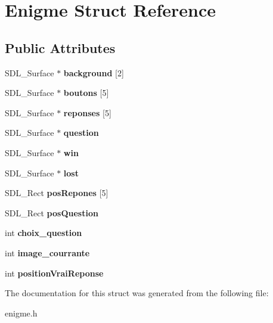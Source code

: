 \hypertarget{structEnigme}{}\section{Enigme Struct Reference}
\label{structEnigme}
\subsection*{Public Attributes}
\begin{DoxyCompactItemize}
\item 
\mbox{\label{structEnigme_a4cd8d8e0cb1572ed1f34f17b7c9d5936}} 
S\+D\+L\+\_\+\+Surface $\ast$ {\bfseries background} \mbox{[}2\mbox{]}
\item 
\mbox{\label{structEnigme_a9461c400dca33109161b4e274665623f}} 
S\+D\+L\+\_\+\+Surface $\ast$ {\bfseries boutons} \mbox{[}5\mbox{]}
\item 
\mbox{\label{structEnigme_ac9591e5cf1c5ed6bd3aafde9dcac1abe}} 
S\+D\+L\+\_\+\+Surface $\ast$ {\bfseries reponses} \mbox{[}5\mbox{]}
\item 
\mbox{\label{structEnigme_ade179239287a8895af3b03645401f42d}} 
S\+D\+L\+\_\+\+Surface $\ast$ {\bfseries question}
\item 
\mbox{\label{structEnigme_a59e8d5c6333aaed6c6b7f611283897f7}} 
S\+D\+L\+\_\+\+Surface $\ast$ {\bfseries win}
\item 
\mbox{\label{structEnigme_ab26b2e7b5c20c0941127162ae81222d7}} 
S\+D\+L\+\_\+\+Surface $\ast$ {\bfseries lost}
\item 
\mbox{\label{structEnigme_a919ddc72bc942752bb0ed286d562781b}} 
S\+D\+L\+\_\+\+Rect {\bfseries pos\+Repones} \mbox{[}5\mbox{]}
\item 
\mbox{\label{structEnigme_aa2e04f02c23d489994e4834313a90ec8}} 
S\+D\+L\+\_\+\+Rect {\bfseries pos\+Question}
\item 
\mbox{\label{structEnigme_a173ec8a7cd7b2afdecabae655a3d62f2}} 
int {\bfseries choix\+\_\+question}
\item 
\mbox{\label{structEnigme_a9e63249d7a05e0e4c6c3d6446afeef05}} 
int {\bfseries image\+\_\+courrante}
\item 
\mbox{\label{structEnigme_a35df3bcc2d86e77715bbaae99ac58217}} 
int {\bfseries position\+Vrai\+Reponse}
\end{DoxyCompactItemize}


The documentation for this struct was generated from the following file\+:\begin{DoxyCompactItemize}
\item 
enigme.\+h\end{DoxyCompactItemize}
